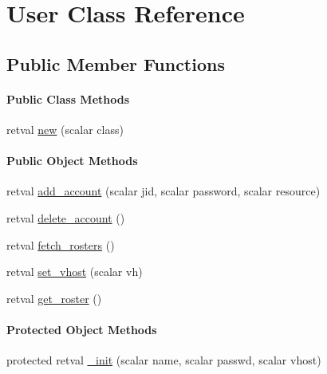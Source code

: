 \hypertarget{classxmpproxy_1_1_user}{
\section{\-User \-Class \-Reference}
\label{classxmpproxy_1_1_user}
}
\subsection*{\-Public \-Member \-Functions}
\begin{Indent}\paragraph*{\-Public \-Class \-Methods}
\begin{DoxyCompactItemize}
\item 
retval \hyperlink{classxmpproxy_1_1_user_a04de1185dad12c1c24cac9235c2bbeff}{new} (scalar class)
\end{DoxyCompactItemize}
\end{Indent}
\begin{Indent}\paragraph*{\-Public \-Object \-Methods}
\begin{DoxyCompactItemize}
\item 
retval \hyperlink{classxmpproxy_1_1_user_a30655875183475d25845fdbbe846af5e}{add\-\_\-account} (scalar jid, scalar password, scalar resource)
\item 
retval \hyperlink{classxmpproxy_1_1_user_ab84aa8fb5903921ebf5f9ef0690ccdbb}{delete\-\_\-account} ()
\item 
retval \hyperlink{classxmpproxy_1_1_user_a8a8969ea1f8d5a4c5e94bf9a5632d235}{fetch\-\_\-rosters} ()
\item 
retval \hyperlink{classxmpproxy_1_1_user_ae3fe99577325087b623bd98f9336e709}{set\-\_\-vhost} (scalar vh)
\item 
retval \hyperlink{classxmpproxy_1_1_user_a85f96a24e4a9b9034a73ada0c6781ce0}{get\-\_\-roster} ()
\end{DoxyCompactItemize}
\end{Indent}
\begin{Indent}\paragraph*{\-Protected \-Object \-Methods}
\begin{DoxyCompactItemize}
\item 
protected retval \hyperlink{classxmpproxy_1_1_user_a4323d6b224675c748bc77305f14c6227}{\-\_\-init} (scalar name, scalar passwd, scalar vhost)
\end{DoxyCompactItemize}
\end{Indent}


